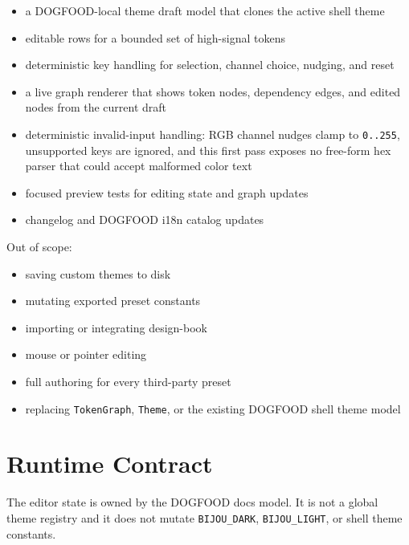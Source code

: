 \begin{itemize}
\tightlist
\item
  a DOGFOOD-local theme draft model that clones the active shell theme
\item
  editable rows for a bounded set of high-signal tokens
\item
  deterministic key handling for selection, channel choice, nudging, and reset
\item
  a live graph renderer that shows token nodes, dependency edges, and edited nodes from the current draft
\item
  deterministic invalid-input handling: RGB channel nudges clamp to \texttt{0\allowbreak{}.\allowbreak{}.\allowbreak{}2\allowbreak{}5\allowbreak{}5}, unsupported keys are ignored, and this first pass exposes no free-form hex parser that could accept malformed color text
\item
  focused preview tests for editing state and graph updates
\item
  changelog and DOGFOOD i18n catalog updates
\end{itemize}

Out of scope:

\begin{itemize}
\tightlist
\item
  saving custom themes to disk
\item
  mutating exported preset constants
\item
  importing or integrating design-book
\item
  mouse or pointer editing
\item
  full authoring for every third-party preset
\item
  replacing \texttt{T\allowbreak{}o\allowbreak{}k\allowbreak{}e\allowbreak{}n\allowbreak{}G\allowbreak{}r\allowbreak{}a\allowbreak{}p\allowbreak{}h}, \texttt{T\allowbreak{}h\allowbreak{}e\allowbreak{}m\allowbreak{}e}, or the existing DOGFOOD shell theme model
\end{itemize}

\section{Runtime Contract}\label{record-187-runtime-contract}

The editor state is owned by the DOGFOOD docs model. It is not a global theme registry and it does not mutate \texttt{B\allowbreak{}I\allowbreak{}J\allowbreak{}O\allowbreak{}U\allowbreak{}\_\allowbreak{}D\allowbreak{}A\allowbreak{}R\allowbreak{}K}, \texttt{B\allowbreak{}I\allowbreak{}J\allowbreak{}O\allowbreak{}U\allowbreak{}\_\allowbreak{}L\allowbreak{}I\allowbreak{}G\allowbreak{}H\allowbreak{}T}, or shell theme constants.

